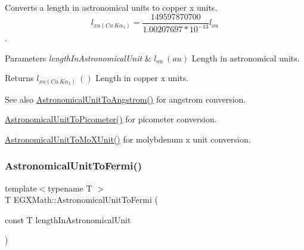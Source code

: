 Converts a length in astronomical units to copper x units. \[ l_{xu(Cu\ K\alpha_1)}= \frac{149597870700}{1.00207697*10^{-13}} l_{au} \]. 


\begin{DoxyParams}{Parameters}
{\em length\+In\+Astronomical\+Unit} & $ l_{au}\ (au)$ Length in astronomical units. \\
\hline
\end{DoxyParams}
\begin{DoxyReturn}{Returns}
$ l_{xu(Cu\ K\alpha_1)}\ ()$ Length in copper x units. 
\end{DoxyReturn}
\begin{DoxySeeAlso}{See also}
\mbox{\hyperlink{group___e_g_x_math-_conversions-_length_conversions-_astronomical-_astronomical_unit-_non-_s_i_ga5efd14d5ca13719b7e06c4614ac0faba}{Astronomical\+Unit\+To\+Angstrom()}} for angstrom conversion. 

\mbox{\hyperlink{group___e_g_x_math-_conversions-_length_conversions-_astronomical-_astronomical_unit-_s_i_gaf512b8f1ace4be83fbeb252b447405d6}{Astronomical\+Unit\+To\+Picometer()}} for picometer conversion. 

\mbox{\hyperlink{group___e_g_x_math-_conversions-_length_conversions-_astronomical-_astronomical_unit-_non-_s_i_ga8b3dc85e14d6129ebfa2f6336d63bf9c}{Astronomical\+Unit\+To\+Mo\+X\+Unit()}} for molybdenum x unit conversion. 
\end{DoxySeeAlso}
\mbox{\label{group___e_g_x_math-_conversions-_length_conversions-_astronomical-_astronomical_unit-_non-_s_i_gacdf3c6bc0a49c0602d659161e6910bec}} 
\subsubsection{\texorpdfstring{Astronomical\+Unit\+To\+Fermi()}{AstronomicalUnitToFermi()}}
{\footnotesize\ttfamily template$<$typename T $>$ \\
T E\+G\+X\+Math\+::\+Astronomical\+Unit\+To\+Fermi (\begin{DoxyParamCaption}\item[{const T}]{length\+In\+Astronomical\+Unit }\end{DoxyParamCaption})}



